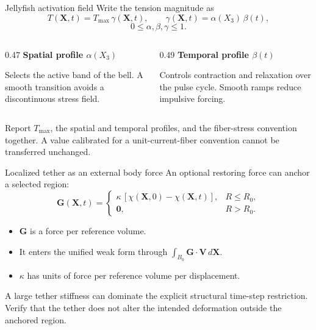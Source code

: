\documentclass[aspectratio=169,11pt]{beamer}
\newcommand{\Xvec}{\bm{X}}
\newcommand{\Gvec}{\bm{G}}
\newcommand{\Vvec}{\bm{V}}
\begin{document}
\begin{frame}{Jellyfish activation field}
Write the tension magnitude as
\[
  T(\Xvec,t)
  =
  T_{\max}\,\gamma(\Xvec,t),
  \qquad
  \gamma(\Xvec,t)=\alpha(X_3)\,\beta(t),
\]
\[
  0\le\alpha,\beta,\gamma\le1.
\]
\begin{columns}[T,onlytextwidth]
\begin{column}{0.47\textwidth}
\textbf{Spatial profile \(\alpha(X_3)\)}

Selects the active band of the bell. A smooth transition avoids a discontinuous stress field.
\end{column}
\begin{column}{0.49\textwidth}
\textbf{Temporal profile \(\beta(t)\)}

Controls contraction and relaxation over the pulse cycle. Smooth ramps reduce impulsive forcing.
\end{column}
\end{columns}
\medskip
\begin{punchbox}
\small Report \(T_{\max}\), the spatial and temporal profiles, and the fiber-stress convention together. A value calibrated for a unit-current-fiber convention cannot be transferred unchanged.
\end{punchbox}
\end{frame}

\begin{frame}{Localized tether as an external body force}
An optional restoring force can anchor a selected region:
\[
  \Gvec(\Xvec,t)=
  \begin{cases}
  \kappa\,[\chi(\Xvec,0)-\chi(\Xvec,t)],
    &R\le R_0,\\[3pt]
  \bm{0},&R>R_0 .
  \end{cases}
\]
\begin{itemize}\itemsep6pt
  \item \(\Gvec\) is a force per reference volume.
  \item It enters the unified weak form through
  \(\int_{B_0}\Gvec\cdot\Vvec\,d\Xvec\).
  \item \(\kappa\) has units of force per reference volume per displacement.
\end{itemize}
\medskip
\begin{punchbox}
\small A large tether stiffness can dominate the explicit structural time-step restriction. Verify that the tether does not alter the intended deformation outside the anchored region.
\end{punchbox}
\end{frame}
\end{document}
